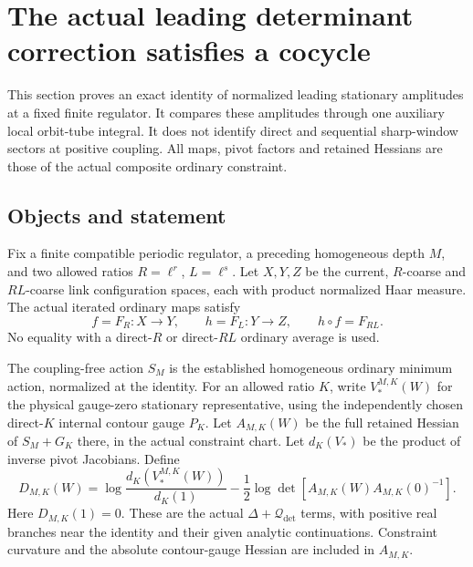 \section{The actual leading determinant correction satisfies a cocycle}
\label{olc-section}

This section proves an exact identity of normalized leading stationary
amplitudes at a fixed finite regulator. It compares these amplitudes
through one auxiliary local orbit-tube integral. It does not identify
direct and sequential sharp-window sectors at positive coupling.
All maps, pivot factors and retained Hessians are those of the
actual composite ordinary constraint.

\subsection{Objects and statement}
\label{olc-setup-section}

Fix a finite compatible periodic regulator, a preceding homogeneous
depth $M$, and two allowed ratios $R=\ell^r$, $L=\ell^s$.
Let $X,Y,Z$ be the current, $R$-coarse and $RL$-coarse link
configuration spaces, each with product normalized Haar measure.
The actual iterated ordinary maps satisfy
\begin{equation}
 f=F_R:X\longrightarrow Y,\qquad
 h=F_L:Y\longrightarrow Z,\qquad
 h\circ f=F_{RL}.
 \label{olc-maps}
\end{equation}
No equality with a direct-$R$ or direct-$RL$ ordinary average
is used.

The coupling-free action $S_M$ is the established homogeneous
ordinary minimum action, normalized at the identity. For an
allowed ratio $K$, write $V_*^{M,K}(W)$ for the physical
gauge-zero stationary representative, using the independently
chosen direct-$K$ internal contour gauge $P_K$. Let
$A_{M,K}(W)$ be the full retained Hessian of $S_M+G_K$ there,
in the actual constraint chart. Let $d_K(V_*)$ be the product
of inverse pivot Jacobians. Define
\begin{equation}
 D_{M,K}(W)
  =\log\frac{d_K(V_*^{M,K}(W))}{d_K(1)}
   -\frac12\log\det\!\left[
         A_{M,K}(W)A_{M,K}(0)^{-1}\right].
 \label{olc-leading}
\end{equation}
Here $D_{M,K}(1)=0$. These are the actual $\Delta+\mathcal Q_{\det}$
terms, with positive real branches near the identity and their
given analytic continuations. Constraint curvature and the
absolute contour-gauge Hessian are included in $A_{M,K}$.

